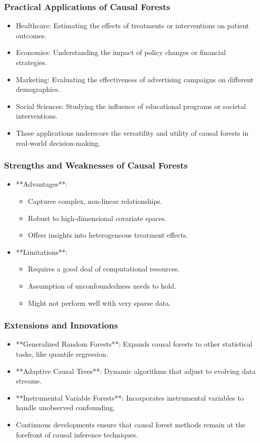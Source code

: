 \documentclass{beamer}
\begin{document}
\begin{frame}
\frametitle{Practical Applications of Causal Forests}
\begin{itemize}
    \item Healthcare: Estimating the effects of treatments or interventions on patient outcomes.
    \item Economics: Understanding the impact of policy changes or financial strategies.
    \item Marketing: Evaluating the effectiveness of advertising campaigns on different demographics.
    \item Social Sciences: Studying the influence of educational programs or societal interventions.
    \item These applications underscore the versatility and utility of causal forests in real-world decision-making.
\end{itemize}
\end{frame}


\begin{frame}
\frametitle{Strengths and Weaknesses of Causal Forests}
\begin{itemize}
    \item **Advantages**:
        \begin{itemize}
            \item Captures complex, non-linear relationships.
            \item Robust to high-dimensional covariate spaces.
            \item Offers insights into heterogeneous treatment effects.
        \end{itemize}
    \item **Limitations**:
        \begin{itemize}
            \item Requires a good deal of computational resources.
            \item Assumption of unconfoundedness needs to hold.
            \item Might not perform well with very sparse data.
        \end{itemize}
\end{itemize}
\end{frame}


\begin{frame}
\frametitle{Extensions and Innovations}
\begin{itemize}
    \item **Generalized Random Forests**: Expands causal forests to other statistical tasks, like quantile regression.
    \item **Adaptive Causal Trees**: Dynamic algorithms that adjust to evolving data streams.
    \item **Instrumental Variable Forests**: Incorporates instrumental variables to handle unobserved confounding.
    \item Continuous developments ensure that causal forest methods remain at the forefront of causal inference techniques.
\end{itemize}
\end{frame}
\end{document}
